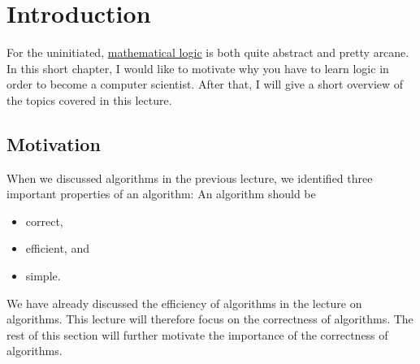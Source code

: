 \chapter{Introduction}
For the uninitiated, \href{https://en.wikipedia.org/wiki/Mathematical_logic}{mathematical logic} 
is both quite abstract and pretty arcane.  
In this short chapter, I would like to motivate why you have to learn
logic in order to become a computer scientist.  After that, I will give a short overview of the topics covered
in this lecture.

\section{Motivation}
When we discussed algorithms in the previous lecture, we identified three important properties of an algorithm:
An algorithm should be
\begin{itemize}
\item correct,
\item efficient, and
\item simple.  
\end{itemize}
We have already discussed the efficiency of algorithms in the lecture on algorithms.  This lecture will
therefore focus on the correctness of algorithms. The rest of this section will further motivate the
importance of the correctness of algorithms. 

